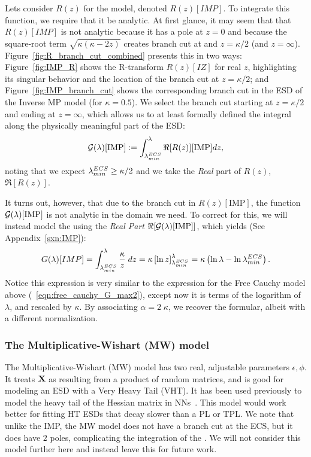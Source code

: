 Lets consider $R(z)$ for the \InverseMP model, denoted $R(z)[IMP]$.
To integrate this function, we require that it be analytic.
At first glance, it may seem that that $R(z)[IMP]$ is not analytic because it
has a pole at $z=0$ and because the square-root term $\sqrt{\kappa(\kappa-2z)}$  creates branch
cut at and $z=\kappa/2$ (and $z=\infty$).
Figure~\ref{fig:R_branch_cut_combined} presents this in two ways:
Figure~\ref{fig:IMP_R} shows the R-transform $R(z)[IZ]$ for real $z$, highlighting its singular behavior and the location of the branch cut at $z = \kappa/2$; and
Figure~\ref{fig:IMP_branch_cut} shows the corresponding branch cut in the ESD of the Inverse MP model (for $\kappa = 0.5$).
We select the branch cut starting at $z=\kappa/2$ and ending at $z=\infty$,
which allows us to at least formally defined the integral along the physically meaningful part of the ESD:
\begin{equation}
\label{eqn:IMP_model_1} 
\mathcal{G(\lambda)}[\mathrm{IMP}] := \int_{\lambda^{ECS}_{min}}^{\lambda} \Re[R(z)][\mathrm{IMP}] dz  ,
\end{equation}
noting that we expect $\lambda^{ECS}_{min}\ge\kappa/2$ and we take the \emph{Real} part of $R(z)$, $\Re[R(z)]$.

It turns out, however, that due to the branch cut in $R(z)[\mathrm{IMP}]$,
the function $\mathcal{G(\lambda)}[\mathrm{IMP}]$ is not analytic in the domain we need. 
To correct for this, we will instead model the \LayerQualitySquared using the \emph{Real Part} $\Re[\mathcal{G(\lambda)}[\mathrm{IMP}]]$,
which yields (See Appendix~\ref{sxn:IMP}):
\begin{equation}
  \label{eqn:IMP_model_2}
G(\lambda)[IMP] = \int_{\lambda^{ECS}_{min}}^\lambda \frac{\kappa}{z}\;dz = \kappa \left[ \ln z \right]_{\lambda^{ECS}_{min}}^\lambda = \kappa \left( \ln \lambda - \ln \lambda^{ECS}_{min}\right).
\end{equation}
Notice this expression is very similar to the expression for the Free Cauchy model above (\EQN~\ref{eqn:free_cauchy_G_max2}), except
now it is terms of the logarithm of $\lambda$, and rescaled by $\kappa$.
By associating $\alpha=2\;\kappa$, we recover the \ALPHAHAT formular, albeit with a different normalization.

\subsubsection{The Multiplicative-Wishart (MW) model}
The Multiplicative-Wishart (MW) model  has two real, adjustable parameters $\epsilon,\phi$.
It treats $\mathbf{X}$ as resulting from a product of random matrices, and is good for modeling an ESD with a Very Heavy Tail (VHT).
It has been used previously to model the heavy tail of the Hessian matrix in NNs~\cite{PW16_NIPS}.
This model would work better for fitting HT ESDs that decay slower than a PL or TPL.
We note that unlike the IMP, the MW model does not have a branch cut at the ECS, but it does
have $2$ poles, complicating the integration of the \RTransform.
We will not consider this model further here and instead leave this for future work.


